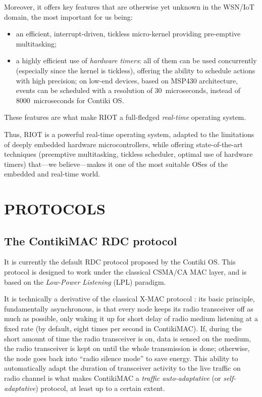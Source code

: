 \documentclass[a4paper,twoside]{article}
\begin{document}
Moreover, it offers key features that are otherwise yet unknown in
the WSN/IoT domain, the most important for us being:
\begin{itemize}
\item an efficient, interrupt-driven, tickless micro-kernel providing
      pre-emptive multitasking;
\item a highly efficient use of \emph{hardware timers}: all of them can be
      used concurrently (especially since the kernel is tickless), offering
      the ability to schedule actions with high precision; on low-end
      devices, based on MSP430 architecture, events can be scheduled
      with a resolution of 30~microseconds, instead of 8000~microseconds
      for Contiki OS.
\end{itemize}
These features are what make RIOT a full-fledged \emph{real-time} operating
system.

Thus, RIOT is a powerful real-time operating system, adapted to the
limitations of deeply embedded hardware microcontrollers, while offering
state-of-the-art techniques (preemptive multitasking, tickless scheduler,
optimal use of hardware timers) that---we believe---makes it one of
the most suitable OSes of the embedded and real-time world.



\section{\uppercase{Protocols}}
\label{SectProtoDescription}

\subsection{The ContikiMAC RDC protocol}

It is currently the default RDC protocol proposed by the Contiki OS.
This protocol is designed to work under the classical CSMA/CA MAC layer,
and is based on the \emph{Low-Power Listening} (LPL) paradigm.

It is technically a derivative of the classical X-MAC protocol \cite{XMAC}:
its basic principle, fundamentally asynchronous, is that every node keeps
its radio transceiver off as much as possible, only waking it up for short
delay of radio medium listening at a fixed rate (by default, eight times
per second in ContikiMAC). If, during the short amount of time the radio
transceiver is on, data is sensed on the medium, the radio transceiver
is kept on until the whole transmission is done; otherwise, the node
goes back into ``radio silence mode'' to save energy.
This ability to automatically adapt the duration of transceiver activity
to the live traffic on radio channel is what makes ContikiMAC a
\emph{traffic auto-adaptative} (or \emph{self-adaptative}) protocol,
at least up to a certain extent.
\end{document}
